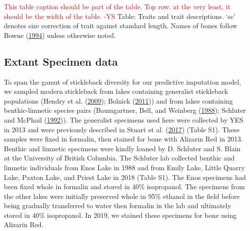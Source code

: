 \documentclass[
  12pt,
]{article}
\begin{document}
\textcolor{red}{This table caption should be part of the table. Top row. at the very least, it should be the width of the table. -YS}
Table: Traits and trait descriptions. `sc' denotes size correction of
trait against standard length. Names of bones follow Bowne
(\protect\hyperlink{ref-Bowne1994}{1994}) unless otherwise noted.

\hypertarget{extant-specimen-data}{%
\subsection{Extant Specimen data}\label{extant-specimen-data}}

To span the gamut of stickleback diversity for our predictive imputation
model, we sampled modern stickleback from lakes containing generalist
stickleback populations (Hendry et al.
(\protect\hyperlink{ref-Hendryetal2009}{2009}); Bolnick
(\protect\hyperlink{ref-Bolnick2011}{2011})) and from lakes containing
benthic-limnetic species pairs (Baumgartner, Bell, and Weinberg
(\protect\hyperlink{ref-Baumgartneretal1988}{1988}); Schluter and
McPhail (\protect\hyperlink{ref-SchluterandMcPhail1992}{1992})). The
generalist specimens used here were collected by YES in 2013 and were
previously described in Stuart et al.
(\protect\hyperlink{ref-Stuartetal2017}{2017}) (Table S1). These samples
were fixed in formalin, then stained for bone with Alizarin Red in 2013.
Benthic and limnetic specimens were kindly loaned by D. Schluter and S.
Blain at the University of British Columbia. The Schluter lab collected
benthic and limnetic individuals from Enos Lake in 1988 and from Emily
Lake, Little Quarry Lake, Paxton Lake, and Priest Lake in 2018 (Table
S1). The Enos specimens had been fixed whole in formalin and stored in
40\% isopropanol. The specimens from the other lakes were initially
preserved whole in 95\% ethanol in the field before being gradually
transferred to water then formalin in the lab and ultimately stored in
40\% isopropanol. In 2019, we stained these specimens for bone using
Alizarin Red.
\end{document}
